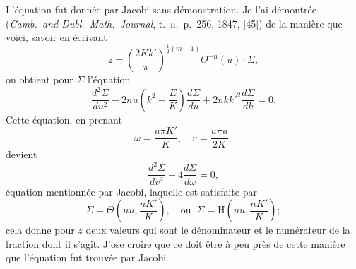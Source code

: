 \documentclass[11pt,a4paper]{article}
\begin{document}
L'\'{e}quation fut donn\'{e}e par Jacobi sans d\'{e}monstration. Je l'ai d\'{e}montr\'{e}e (\textit{Camb.\ and Dubl.\ Math.\ Journal}, t.\ \textsc{ii}.\ p.\ 256, 1847, [45]) de la mani\`{e}re que voici, savoir en \'{e}crivant
\[
z=\left(\frac{2Kk'}{\pi}\right)^{\!\!\tfrac{1}{2}(m-1)}\!\!\Theta^{-n}(u)\cdot\Sigma,
\]
on obtient pour $\Sigma$ l'\'{e}quation
\[
\frac{d^2\Sigma}{du^2}-2nu\!\left(k^2-\frac{E}{K}\right)\frac{d\Sigma}{du}+2nkk'^2\frac{d\Sigma}{dk}=0.
\]
Cette \'{e}quation, en prenant
\[
\omega=\frac{u\pi K'}{K},\quad v=\frac{u\pi u}{2K},
\]
devient
\[
\frac{d^2\Sigma}{dv^2}-4\frac{d\Sigma}{d\omega}=0,
\]
\'{e}quation mentionn\'{e}e par Jacobi, laquelle est satisfaite par
\[
\Sigma=\Theta\!\left(nu,\frac{nK'}{K}\right),\quad \text{ou}\;\;\Sigma=\mathrm{H}\!\left(nu,\frac{nK'}{K}\right);
\]
cela donne pour $z$ deux valeurs qui sont le d\'{e}nominateur et le num\'{e}rateur de la fraction dont il s'agit. J'ose croire que ce doit \^{e}tre \`{a} peu pr\`{e}s de cette mani\`{e}re que l'\'{e}quation fut trouv\'{e}e par Jacobi.
\end{document}
